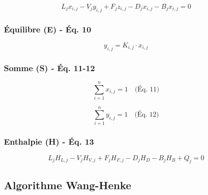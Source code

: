 \documentclass[11pt,a4paper]{article}
\begin{document}
\begin{tcolorbox}[colback=yellow!10,colframe=orange!50!black,title=Équation 9: MESH - Material Balance]
\begin{equation}
L_j x_{i,j} - V_j y_{i,j} + F_j z_{i,j} - D_j x_{i,j} - B_j x_{i,j} = 0
\end{equation}
\end{tcolorbox}

\subsubsection{Équilibre (E) - Éq. 10}

\begin{tcolorbox}[colback=yellow!10,colframe=orange!50!black,title=Équation 10: MESH - Equilibrium]
\begin{equation}
y_{i,j} = K_{i,j} \cdot x_{i,j}
\end{equation}
\end{tcolorbox}

\subsubsection{Somme (S) - Éq. 11-12}

\begin{tcolorbox}[colback=yellow!10,colframe=orange!50!black,title=Équations 11-12: MESH - Summation]
\begin{equation}
\sum_{i=1}^{n} x_{i,j} = 1 \quad \text{(Éq. 11)}
\end{equation}

\begin{equation}
\sum_{i=1}^{n} y_{i,j} = 1 \quad \text{(Éq. 12)}
\end{equation}
\end{tcolorbox}

\subsubsection{Enthalpie (H) - Éq. 13}

\begin{tcolorbox}[colback=yellow!10,colframe=orange!50!black,title=Équation 13: MESH - Heat Balance]
\begin{equation}
L_j H_{L,j} - V_j H_{V,j} + F_j H_{F,j} - D_j H_D - B_j H_B + Q_j = 0
\end{equation}
\end{tcolorbox}

\subsection{Algorithme Wang-Henke}
\end{document}

